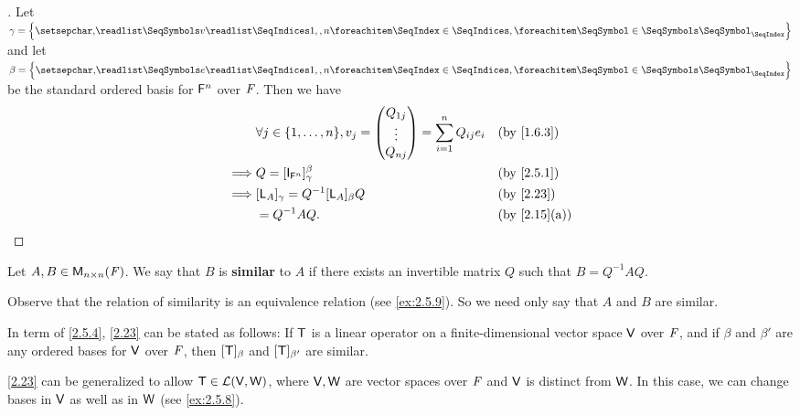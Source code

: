 \begin{proof}[]
	Let \(\gamma = \set{\seq{v}{1,,n}}\) and let \(\beta = \set{\seq{e}{1,,n}}\) be the standard ordered basis for \(\mathsf{F}^n\) over \(\mathit{F}\).
	Then we have
	\begin{align*}
		         & \forall j \in \set{1, \dots, n}, v_j = \begin{pmatrix}
			                                                  Q_{1 j} \\
			                                                  \vdots  \\
			                                                  Q_{n j}
		                                                  \end{pmatrix} = \sum_{i = 1}^n Q_{i j} e_i &  & \by{1.6.3} \\
		\implies & Q = [\IT_{\vs{F}^n}]_{\gamma}^{\beta}                  &  & \by{2.5.1}                            \\
		\implies & [\L_A]_{\gamma} = Q^{-1} [\L_A]_{\beta} Q              &  & \by{2.23}                             \\
		         & = Q^{-1} A Q.                                          &  & \by{2.15}[a]
	\end{align*}
\end{proof}

\begin{defn}\label{2.5.4}
	Let \(A, B \in \ms[n][n][\F]\).
	We say that \(B\) is \textbf{similar} to \(A\) if there exists an invertible matrix \(Q\) such that \(B = Q^{-1} A Q\).
\end{defn}

\begin{note}
	Observe that the relation of similarity is an equivalence relation
	(see \cref{ex:2.5.9}).
	So we need only say that \(A\) and \(B\) are similar.
\end{note}

\begin{note}
	In term of \cref{2.5.4}, \cref{2.23} can be stated as follows:
	If \(\mathsf{T}\) is a linear operator on a finite-dimensional vector space \(\mathsf{V}\) over \(\mathit{F}\), and if \(\beta\) and \(\beta'\) are any ordered bases for \(\mathsf{V}\) over \(\mathit{F}\), then \([\mathsf{T}]_{\beta}\) and \([\mathsf{T}]_{\beta'}\) are similar.
\end{note}

\begin{note}
	\cref{2.23} can be generalized to allow \(\mathsf{T} \in \mathcal{L}(\mathsf{V}, \mathsf{W})\), where \(\mathsf{V}, \mathsf{W}\) are vector spaces over \(\mathit{F}\) and \(\mathsf{V}\) is distinct from \(\mathsf{W}\).
	In this case, we can change bases in \(\mathsf{V}\) as well as in \(\mathsf{W}\)
	(see \cref{ex:2.5.8}).
\end{note}

